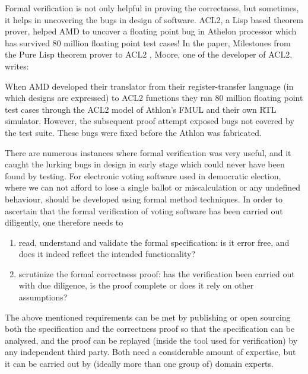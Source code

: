	\noindent
	Formal verification is not only helpful in proving the correctness, 
	but sometimes, it helps in uncovering the bugs in design of
	software. ACL2, a Lisp based theorem prover, helped 
	AMD to uncover a floating point bug in Athelon processor which 
	has survived 80 million floating point test cases! 
	In the paper, Milestones from the Pure Lisp theorem prover to ACL2
	\citep{Moore2019}, Moore, one of the developer of ACL2, writes:
	
	\begin{displayquote}
	
	When AMD developed their translator 
	from their register-transfer language (in which designs
	are expressed) to ACL2 functions they ran 80 million 
	floating point test cases through the ACL2 model of 
	Athlon’s FMUL and their own RTL simulator. However, the 
	subsequent proof attempt exposed bugs not covered by the
	test suite. These bugs were fixed before the Athlon was 
	fabricated.
	
	\end{displayquote}
  
   
   There are numerous instances where formal verification 
	was very useful, and it caught the lurking bugs in design in early 
	stage which could never have been found by testing.
	For electronic voting software used in democratic election, where we 
	can not afford to lose a single ballot or miscalculation 
	or any undefined behaviour, should be developed 
	using formal method techniques.
	In order to ascertain that the formal verification of voting software has been 
	carried out diligently, one therefore needs to
	\begin{enumerate}
	\item read, understand and validate the formal specification: is it 
	error free, and does it indeed reflect the intended functionality?
	\item scrutinize the formal correctness proof: has the verification
	been carried out with due diligence, is the proof complete or does
	it rely on other assumptions?

	\end{enumerate}			
	
	\noindent
	The above mentioned requirements can be met by publishing or open sourcing
	both the
	specification and the correctness proof so that the specification
	can be analysed, and the proof can be replayed (inside the tool used for 
	verification) by any independent third party. Both need a
	considerable amount of expertise, but it can be carried out by (ideally
	more than one group of) domain experts.
	


